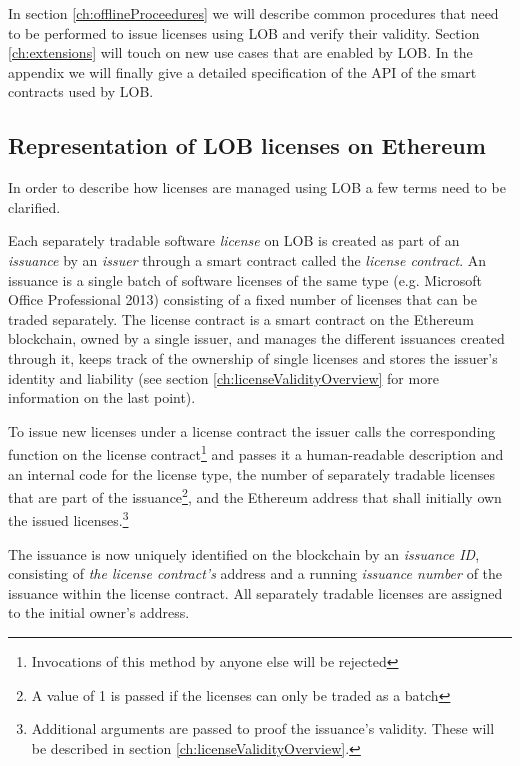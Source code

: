 \documentclass[a4paper]{article}
\begin{document}
In section \ref{ch:offlineProceedures} we will describe common procedures that need to be performed to issue licenses using LOB and verify their validity. Section \ref{ch:extensions} will touch on new use cases that are enabled by LOB. In the appendix we will finally give a detailed specification of the API of the smart contracts used by LOB.





\subsection{Representation of LOB licenses on Ethereum}
\label{ch:licenseRepresentationOverview}

In order to describe how licenses are managed using LOB a few terms need to be clarified.

Each separately tradable software \emph{license} on LOB is created as part of an \emph{issuance} by an \emph{issuer} through a smart contract called the \emph{license contract}. An issuance is a single batch of  software licenses of the same type (e.g. Microsoft Office Professional 2013) consisting of a fixed number of licenses that can be traded separately. The license contract is a smart contract on the Ethereum blockchain, owned by a single issuer, and manages the different issuances created through it, keeps track of the ownership of single licenses and stores the issuer's identity and liability (see section \ref{ch:licenseValidityOverview} for more information on the last point).

To issue new licenses under a license contract the issuer calls the corresponding function on the license contract\footnote{Invocations of this method by anyone else will be rejected} and passes it a human-readable description and an internal code for the license type, the number of separately tradable licenses that are part of the issuance\footnote{A value of 1 is passed if the licenses can only be traded as a batch}, and the Ethereum address that shall initially own the issued licenses.\footnote{Additional arguments are passed to proof the issuance's validity. These will be described in section \ref{ch:licenseValidityOverview}.}

The issuance is now uniquely identified on the blockchain by an \emph{issuance ID}, consisting of \emph{the license contract's} address and a running \emph{issuance number} of the issuance within the license contract. All separately tradable licenses are assigned to the initial owner's address.
\end{document}
